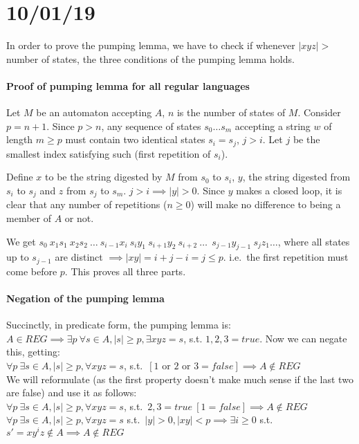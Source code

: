 \documentclass[12 pt]{article}
\begin{document}
\section{10/01/19}
In order to prove the pumping lemma, we have to check if whenever
$|xyz| > $ number of states, the three conditions of the pumping lemma
holds.
\paragraph{Proof of pumping lemma for all regular languages}
Let $M$ be an automaton accepting $A$, $n$ is the number of states of
$M$. Consider $p = n+1$. Since $p>n$, any sequence of states
$s_0\ldots s_m$ accepting a string $w$ of length $m \geq p$ must
contain two identical states $s_i = s_j$, $j > i$. Let $j$ be the
smallest index satisfying such (first repetition of $s_i$).

Define $x$ to be the string digested by $M$ from $s_0$ to $s_i$, $y$,
the string digested from $s_i$ to $s_j$ and $z$ from $s_j$ to
$s_m$. $j > i \implies |y| > 0$. Since $y$ makes a closed loop, it is
clear that any number of repetitions ($n \geq 0$) will make no
difference to being a member of $A$ or not.

We get $s_0\ x_1s_1\ x_2s_2\ \ldots\ s_{i-1}x_i\ s_iy_1\ s_{i+1}y_2\
s_{i+2}\ \ldots\ \ s_{j-1}y_{j-1}\ s_jz_1 \ldots$, where all states up to
$s_{j-1}$ are distinct $\implies |xy| = i + j - i = j \leq p$. i.e.\
the first repetition must come before $p$. This proves all three
parts.

\paragraph{Negation of the pumping lemma}
Succinctly, in predicate form, the pumping lemma is:\\
$A \in REG \implies \exists p\ \forall s \in A, |s| \geq p, \exists x
y z = s$, s.t. $1,2,3 = true$. Now we can negate this, getting:
\\ $\forall p\ \exists s \in A, |s| \geq p, \forall x y z = s$, s.t.\ $ [1
\text{ or } 2 \text{ or } 3 = false] \implies A \notin REG$
\\ We will reformulate (as the first property doesn't make much sense
if the last two are false) and use it as follows:
\\ $\forall p\ \exists s \in A, |s| \geq p, \forall x y z = s$, s.t.\
$2,3=true\ [1 = false] \implies A \notin REG$
\\ $\forall p \ \exists s \in A, |s| \geq p, \forall x y z = s$ s.t.\
$|y| > 0, |xy| < p \implies \exists i \geq 0$ s.t.\ $s' = xy^iz \notin
A \implies A \notin REG$
\end{document}
